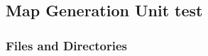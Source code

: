 \documentclass{CSSRforAfrica}
\begin{document}
%  



\newpage
 \subsection{Map Generation Unit test} 
\label{subsection:map_generation_test}

\subsubsection{Files and Directories}
\label{subsubsection:map_generation_test_files}
 
\end{document}
